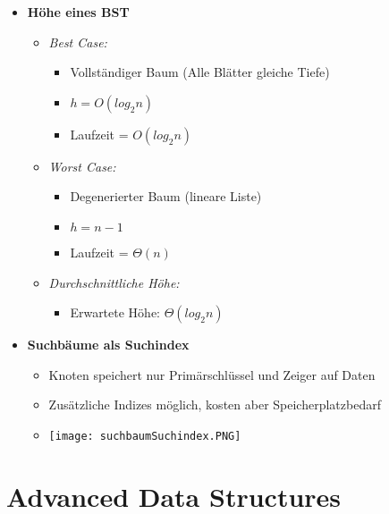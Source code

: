 \begin{itemize}
        \item \textbf{Höhe eines BST}
            \begin{itemize}
                \item \textit{Best Case:}
                    \begin{itemize}
                        \item Vollständiger Baum (Alle Blätter gleiche Tiefe)
                        \item $h = O(log_2 n)$
                        \item Laufzeit = $O(log_2 n)$
                    \end{itemize}
                \item \textit{Worst Case:}
                    \begin{itemize}
                        \item Degenerierter Baum (lineare Liste)
                        \item $h = n - 1$
                        \item Laufzeit = $\Theta(n)$
                    \end{itemize}
                \item \textit{Durchschnittliche Höhe:}
                    \begin{itemize}
                        \item Erwartete Höhe: $\Theta(log_2 n)$
                    \end{itemize}
            \end{itemize}

        \item \textbf{Suchbäume als Suchindex}
            \begin{itemize}
                \item Knoten speichert nur Primärschlüssel und Zeiger auf Daten
                \item Zusätzliche Indizes möglich, kosten aber Speicherplatzbedarf
                \item[] \texttt{[image: suchbaumSuchindex.PNG]}
            \end{itemize}
    \end{itemize}
\pagebreak

\section{Advanced Data Structures}
